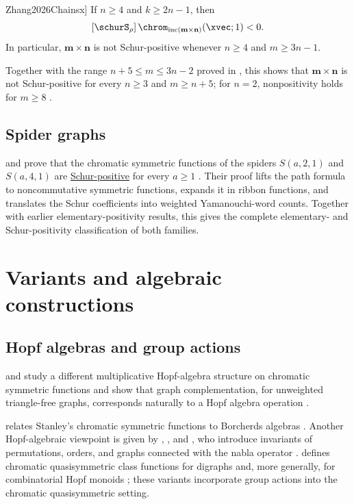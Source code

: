 \begin{theorem}[Zhang, \cite[Thm.~3.1]{Zhang2026Chainsx}]
If $n\geq4$ and $k\geq2n-1$, then
\[
[\schurS_\rho]\,
\chrom_{\operatorname{inc}(\mathbf{m}\times\mathbf{n})}(\xvec;1)<0.
\]
In particular, $\mathbf{m}\times\mathbf{n}$ is not Schur-positive whenever
$n\geq4$ and $m\geq3n-1$.
\end{theorem}

Together with the range $n+5\leq m\leq3n-2$ proved in
\cite{LiQiuYangZhang2024x}, this shows that
$\mathbf{m}\times\mathbf{n}$ is not Schur-positive for every
$n\geq3$ and $m\geq n+5$; for $n=2$, nonpositivity holds for $m\geq8$
\cite[Cor.~3.4]{Zhang2026Chainsx}.


\subsection[chromaticSpiderFamilies]{Spider graphs}

 and  prove that the chromatic
symmetric functions of the spiders \(S(a,2,1)\) and \(S(a,4,1)\) are
\hyperref[schurPositiveDefinition]{Schur-positive} for every \(a\geq1\)
\cite[Thms.~4.2 and~4.6]{ThibonWang2023x}.  Their proof lifts the path
formula to noncommutative symmetric functions, expands it in ribbon functions,
and translates the Schur coefficients into weighted Yamanouchi-word counts.
Together with earlier elementary-positivity results, this gives the complete
elementary- and Schur-positivity classification of both families.


\section[chromaticQuasisymmetricMisc]{Variants and algebraic constructions}

\subsection[chromaticAlgebraicVariants]{Hopf algebras and group actions}

 and  study a different multiplicative
Hopf-algebra structure on chromatic symmetric functions and show that graph
complementation, for unweighted triangle-free graphs, corresponds naturally
to a Hopf algebra operation \cite{LinPierson2025x}.

 relates Stanley's chromatic symmetric functions to
Borcherds algebras \cite{Arunkumar2021}.  Another Hopf-algebraic viewpoint is
given by , , and
, who introduce invariants of permutations, orders, and
graphs connected with the nabla operator \cite{AvalBergeronMachacek2020}.
 defines chromatic quasisymmetric class functions for
digraphs and, more generally, for combinatorial Hopf monoids
\cite{White2021,White2025}; these variants incorporate group actions into the
chromatic quasisymmetric setting.


